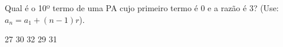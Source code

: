 Qual é o 10º termo de uma PA cujo primeiro termo é 0 e a razão é 3? (Use: $a_n=a_1+(n-1)r$).

27
30
32
29
31





